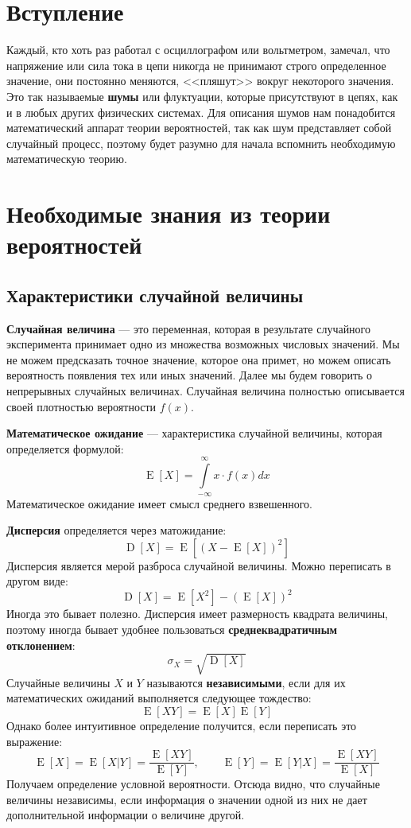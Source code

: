 \documentclass[12pt, a4paper]{article}
\DeclareMathOperator{\E}{E}
\DeclareMathOperator{\D}{D}
\begin{document}

\section*{Вступление}

Каждый, кто хоть раз работал с осциллографом или вольтметром, замечал, что напряжение или сила тока в цепи никогда не принимают строго определенное значение, они постоянно меняются, <<пляшут>> вокруг некоторого значения. Это так называемые \textbf{шумы} или флуктуации, которые присутствуют в цепях, как и в любых других физических системах. Для описания шумов нам понадобится математический аппарат теории вероятностей, так как шум представляет собой случайный процесс, поэтому будет разумно для начала вспомнить необходимую математическую теорию.

\section*{Необходимые знания из теории вероятностей}

\subsection*{Характеристики случайной величины}

\textbf{Случайная величина} — это переменная, которая в результате случайного эксперимента принимает одно из множества возможных числовых значений. Мы не можем предсказать точное значение, которое она примет, но можем описать вероятность появления тех или иных значений. Далее мы будем говорить о непрерывных случайных величинах. Случайная величина полностью описывается своей плотностью вероятности $f(x)$.

\textbf{Математическое ожидание} — характеристика случайной величины, которая определяется формулой:
\[
\E[X] = \int\limits_{-\infty}^{\infty}x \cdot f(x)dx
\]
Математическое ожидание имеет смысл среднего взвешенного.

\textbf{Дисперсия} определяется через матожидание:
\[
\D[X] = \E[(X - \E[X])^2]
\]
Дисперсия является мерой разброса случайной величины. Можно переписать в другом виде:
\[
\D[X] = \E[X^2] - (\E[X])^2
\]
Иногда это бывает полезно. Дисперсия имеет размерность квадрата величины, поэтому иногда бывает удобнее пользоваться \textbf{среднеквадратичным отклонением}:
\[
\sigma_X = \sqrt{\D[X]}
\]
Случайные величины $X$ и $Y$ называются \textbf{независимыми}, если для их математических ожиданий выполняется следующее тождество:
\[
\E[XY] = \E[X]\E[Y]
\]
Однако более интуитивное определение получится, если переписать это выражение:
\[
\E[X] = \E[X|Y] = \frac{\E[XY]}{\E[Y]}, \qquad \E[Y]= \E[Y|X] = \frac{\E[XY]}{\E[X]}
\]
Получаем определение условной вероятности. Отсюда видно, что случайные величины независимы, если информация о значении одной из них не дает дополнительной информации о величине другой.
\end{document}
